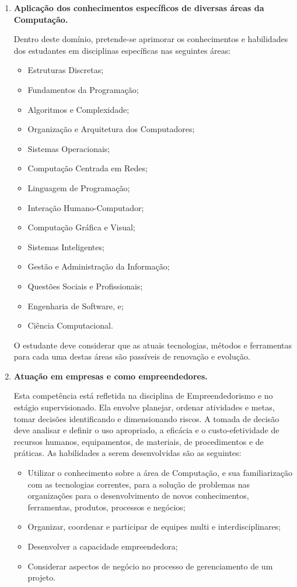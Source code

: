 \begin{enumerate}
    \item \textbf{Aplicação dos conhecimentos específicos de diversas áreas da
    Computação.}

    Dentro deste domínio, pretende-se aprimorar os conhecimentos e habilidades
    dos estudantes em disciplinas específicas nas seguintes áreas:
    \begin{itemize}
        \item Estruturas Discretas;
        \item Fundamentos da Programação;
        \item Algoritmos e Complexidade;
        \item Organização e Arquitetura dos Computadores;
        \item Sistemas Operacionais;
        \item Computação Centrada em Redes;
        \item Linguagem de Programação;
        \item Interação Humano-Computador;
        \item Computação Gráfica e Visual;
        \item Sistemas Inteligentes;
        \item Gestão e Administração da Informação;
        \item Questões Sociais e Profissionais;
        \item Engenharia de Software, e;
        \item Ciência Computacional.
    \end{itemize}

    O estudante deve considerar que as atuais tecnologias, métodos e
    ferramentas para cada uma destas áreas são passíveis de renovação e
    evolução.

    \item \textbf{Atuação em empresas e como empreendedores.}

    Esta competência está refletida na disciplina de Empreendedorismo e no
    estágio supervisionado.
    Ela envolve planejar, ordenar atividades e metas, tomar decisões
    identificando e dimensionando riscos.
    A tomada de decisão deve analisar e definir o uso apropriado, a eficácia e
    o custo-efetividade de recursos humanos, equipamentos, de materiais, de
    procedimentos e de práticas.
    As habilidades a serem desenvolvidas são as seguintes:
    \begin{itemize}
        \item Utilizar o conhecimento sobre a área de Computação, e sua
        familiarização com as tecnologias correntes, para a solução de
        problemas nas organizações para o desenvolvimento de novos
        conhecimentos, ferramentas, produtos, processos e negócios;
        \item Organizar, coordenar e participar de equipes multi e
        interdisciplinares;
        \item Desenvolver a capacidade empreendedora;
        \item Considerar aspectos de negócio no processo de gerenciamento de um
        projeto.
    \end{itemize}


\end{enumerate}

